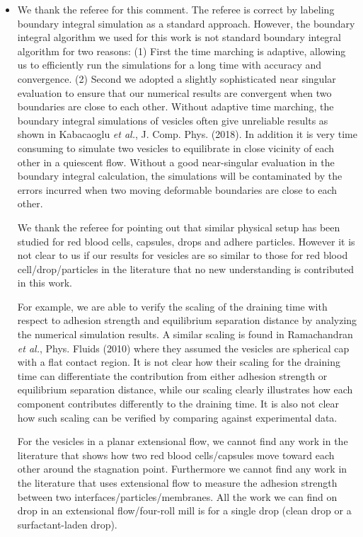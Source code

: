 \documentclass[11pt]{article}
\begin{document}
\begin{itemize}
  \item We thank the referee for this comment. The referee is correct by labeling boundary integral simulation as a standard approach.
  However, the boundary integral algorithm we used for this work is not standard boundary integral algorithm for two reasons: (1) First the time marching is adaptive, allowing us to efficiently run the simulations for a long time with accuracy and convergence. (2) Second we adopted a slightly sophisticated near singular evaluation to ensure that our numerical results are convergent when two boundaries are close to each other. Without adaptive time marching, the boundary integral simulations of vesicles often give unreliable results as shown in
Kabacaoglu {\it et al.}, J. Comp. Phys. (2018). In addition it is very time consuming to simulate two vesicles to equilibrate in close vicinity of each other in a quiescent flow. 
Without a good near-singular evaluation in the boundary integral calculation, the simulations will be contaminated by the errors incurred when two moving deformable boundaries are close to each other.
  
  We thank the referee for pointing out that similar physical setup has been studied for red blood cells, capsules, drops and adhere particles. 
  However it is not clear to us if our results for vesicles are so similar to those for red blood cell/drop/particles in the literature that no new understanding is contributed in this work.
  
For example, we are able to verify the scaling of the draining time with respect to adhesion strength and equilibrium separation distance by analyzing the numerical simulation results. 
A similar scaling is found in Ramachandran {\it et al.}, Phys. Fluids (2010) where they assumed the vesicles are spherical cap with a flat contact region. It is not clear how their scaling for the draining time can differentiate the contribution from either adhesion strength or equilibrium separation distance, while our scaling clearly illustrates how each component contributes differently to the draining time. It is also not clear how such scaling can be verified by comparing against experimental data.

For the vesicles in a planar extensional flow, we cannot find any work in the literature that shows how two red blood cells/capsules move toward each other around the stagnation point. Furthermore we cannot find any work in the literature that uses extensional flow to measure the adhesion strength between two interfaces/particles/membranes. All the work we can find on drop in an extensional flow/four-roll mill is for a single drop (clean drop or a surfactant-laden drop).
  
  
\end{itemize}
\end{document}
